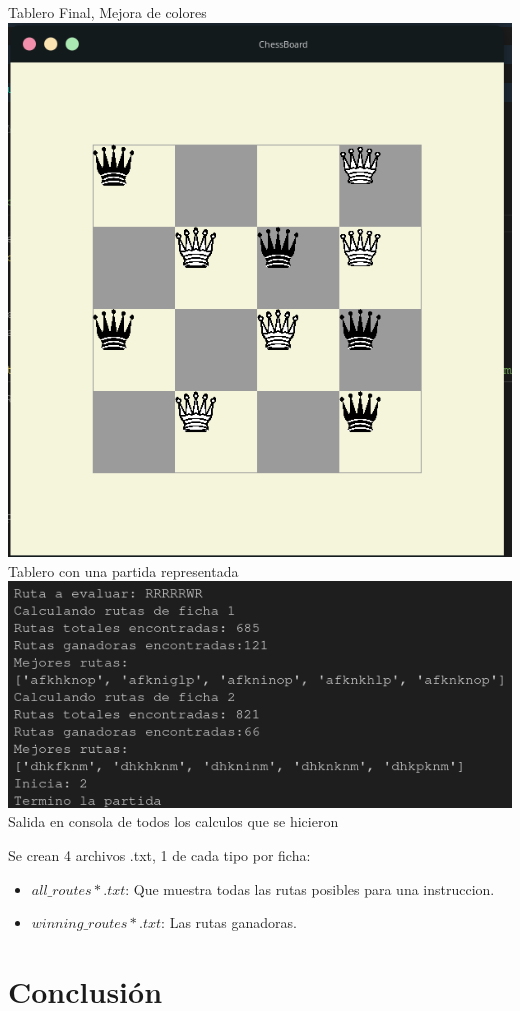 \documentclass{article}
\begin{document}
\begin{center}
    Tablero Final, Mejora de colores
    \includegraphics[width=\textwidth]{Practica7-capt6.png}
    Tablero con una partida representada
    \includegraphics[width=\textwidth]{Practica7-capt7.png}
    Salida en consola de todos los calculos que se hicieron
\end{center}
Se crean 4 archivos .txt, 1 de cada tipo por ficha:
\begin{itemize}
    \item $all\_routes*.txt$: Que muestra todas las rutas posibles para una instruccion.
    \item $winning\_routes*.txt$: Las rutas ganadoras.
\end{itemize}
\section*{Conclusi\'on}
\end{document}

